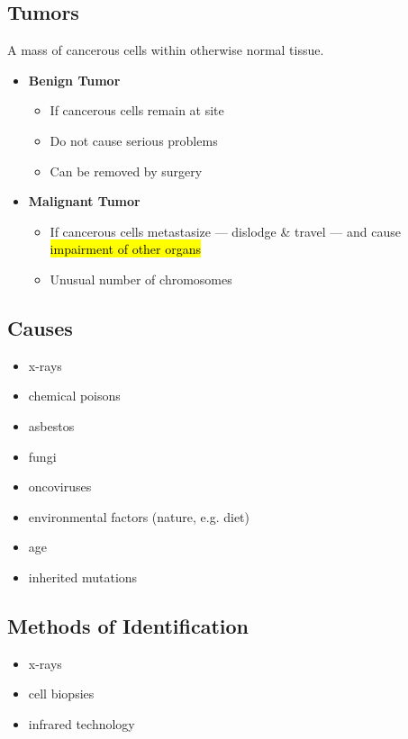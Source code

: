 \documentclass[a4paper,12pt]{article}
\begin{document}
\subsection{Tumors}\noindent

A mass of cancerous cells within otherwise normal tissue.

\begin{itemize}
    \item{
            \textbf{Benign Tumor}

            \begin{itemize}
                \item{If cancerous cells remain at site}
                \item{Do not cause serious problems}
                \item{Can be removed by surgery}
            \end{itemize}
        }
    \item{
            \textbf{Malignant Tumor}

            \begin{itemize}
                \item{If cancerous cells metastasize --- dislodge \& travel --- and cause \hl{impairment of other organs}}
                \item{Unusual number of chromosomes}
            \end{itemize}
        }
\end{itemize}

\subsection{Causes}
\begin{itemize}
    \item{x-rays}
    \item{chemical poisons}
    \item{asbestos}
    \item{fungi}
    \item{oncoviruses}
    \item{environmental factors (nature, e.g. diet)}
    \item{age}
    \item{inherited mutations}
\end{itemize}

\subsection{Methods of Identification}
\begin{itemize}
    \item{x-rays}
    \item{cell biopsies}
    \item{infrared technology}
\end{itemize}
\end{document}
